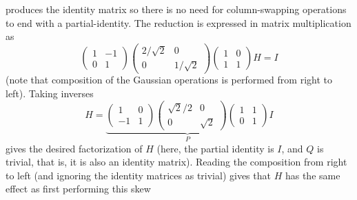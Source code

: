 \begin{ans}{1}
\begin{exparts}
\begin{equation*}
          \end{equation*}
          produces the identity matrix
          so there is no need for column-swapping operations
          to end with a partial-identity.
        \partsitem The reduction is expressed in matrix multiplication
          as
          \begin{equation*}
            \begin{pmatrix}
              1  &-1 \\
              0  &1
            \end{pmatrix}
            \begin{pmatrix}
              2/\sqrt{2}  &0         \\
              0           &1/\sqrt{2}
            \end{pmatrix}
            \begin{pmatrix}
              1  &0 \\
              1  &1
            \end{pmatrix}
            H
            =I
          \end{equation*}
          (note that composition of the Gaussian operations is performed
          from right to left).
        \partsitem  Taking inverses
          \begin{equation*}
            H
            =
            \underbrace{
              \begin{pmatrix}
                1  &0 \\
                -1  &1
              \end{pmatrix}
              \begin{pmatrix}
                \sqrt{2}/2  &0         \\
                0           &\sqrt{2}
              \end{pmatrix}
              \begin{pmatrix}
                1  &1 \\
                0  &1
              \end{pmatrix}
             }_P
            I
          \end{equation*}
          gives the desired factorization of $H$ (here, the partial
          identity is $I$, and $Q$ is trivial, that is, it is also an identity
          matrix).
        \partsitem Reading the composition from right to left (and ignoring the
          identity matrices as trivial) gives that $H$ has the same
          effect as first performing this skew
          \begin{center}

\end{center}
\end{exparts}
\end{ans}
